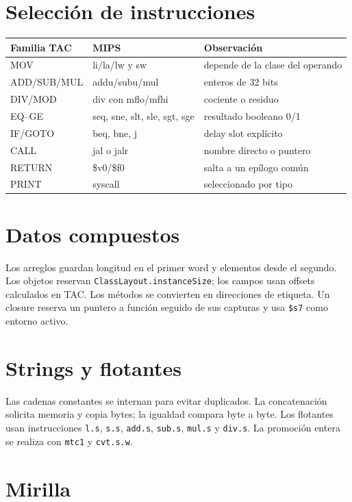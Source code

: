 \documentclass[11pt,letterpaper,oneside]{report}
\newcommand{\codigo}[1]{\texttt{#1}}
\begin{document}
\section{Selecci\'on de instrucciones}

\begin{longtable}{p{3cm}p{4.5cm}p{5.5cm}}
\toprule
Familia TAC & MIPS & Observaci\'on\\\midrule
\endhead
MOV & li/la/lw y sw & depende de la clase del operando\\
ADD/SUB/MUL & addu/subu/mul & enteros de 32 bits\\
DIV/MOD & div con mflo/mfhi & cociente o residuo\\
EQ--GE & seq, sne, slt, sle, sgt, sge & resultado booleano 0/1\\
IF/GOTO & beq, bne, j & delay slot expl\'icito\\
CALL & jal o jalr & nombre directo o puntero\\
RETURN & \$v0/\$f0 & salta a un ep\'ilogo com\'un\\
PRINT & syscall & seleccionado por tipo\\
\bottomrule
\end{longtable}

\section{Datos compuestos}

Los arreglos guardan longitud en el primer word y elementos desde el segundo. Los objetos reservan \codigo{ClassLayout.instanceSize}; los campos usan offsets calculados en TAC. Los m\'etodos se convierten en direcciones de etiqueta. Un closure reserva un puntero a funci\'on seguido de sus capturas y usa \codigo{\$s7} como entorno activo.

\section{Strings y flotantes}

Las cadenas constantes se internan para evitar duplicados. La concatenaci\'on solicita memoria y copia bytes; la igualdad compara byte a byte. Los flotantes usan instrucciones \codigo{l.s}, \codigo{s.s}, \codigo{add.s}, \codigo{sub.s}, \codigo{mul.s} y \codigo{div.s}. La promoci\'on entera se realiza con \codigo{mtc1} y \codigo{cvt.s.w}.

\section{Mirilla}
\end{document}
